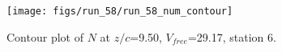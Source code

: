 \begin{figure}[H]
\centering
\texttt{[image: figs/run\_58/run\_58\_num\_contour]}
\caption{Contour plot of $N$ at $z/c$=9.50, $V_{free}$=29.17, station 6.}
\label{fig:run_58_num_contour}
\end{figure}



